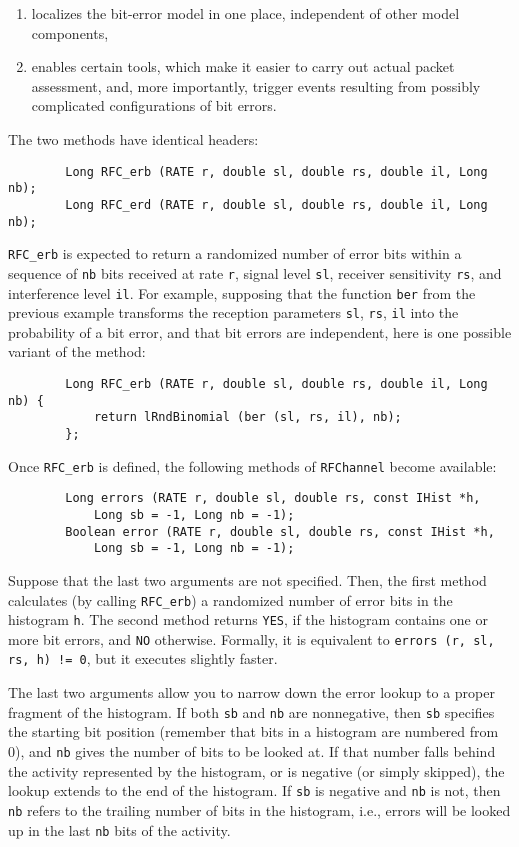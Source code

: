 \begin{enumerate}
\item
localizes the bit-error model in one place, independent of other
model components,
\item
enables certain tools, which make it easier to carry out actual packet
assessment, and, more importantly, trigger events resulting from possibly
complicated configurations of bit errors.
\end{enumerate}

The two methods have identical headers:
\begin{verbatim}
        Long RFC_erb (RATE r, double sl, double rs, double il, Long nb);
        Long RFC_erd (RATE r, double sl, double rs, double il, Long nb);
\end{verbatim}
\noindent
{\tt RFC\_erb}
is expected to return a randomized number of error bits within a
sequence of {\tt nb} bits received at rate {\tt r},
signal level {\tt sl},
receiver sensitivity {\tt rs}, and interference level {\tt il}.
For example, supposing that the function {\tt ber} from the previous example
transforms the reception parameters {\tt sl}, {\tt rs}, {\tt il}
into the probability of a
bit error, and that bit errors are independent, here is one possible
variant of the method:

\begin{verbatim}
        Long RFC_erb (RATE r, double sl, double rs, double il, Long nb) {
            return lRndBinomial (ber (sl, rs, il), nb);
        };
\end{verbatim}
\noindent
Once {\tt RFC\_erb} is defined, the following methods of {\tt RFChannel} become
available:

\begin{verbatim}
        Long errors (RATE r, double sl, double rs, const IHist *h,
            Long sb = -1, Long nb = -1);
        Boolean error (RATE r, double sl, double rs, const IHist *h,
            Long sb = -1, Long nb = -1);
\end{verbatim}
\noindent
Suppose that the last two arguments are not specified.
Then, the first method calculates (by calling {\tt RFC\_erb})
a randomized number of error bits in the histogram {\tt h}.
The second method returns {\tt YES}, if the histogram contains one or more
bit errors, and {\tt NO} otherwise.
Formally, it is equivalent to {\tt errors (r, sl, rs, h) != 0}, but it
executes slightly faster.

The last two arguments allow you to narrow down the error lookup to a
proper fragment of the histogram.
If both {\tt sb} and {\tt nb} are nonnegative, then {\tt sb} specifies
the starting bit position (remember that bits in a histogram
are numbered from 0), and {\tt nb} gives the number of bits to be looked at.
If that number falls behind the activity represented by the histogram, or
is negative (or simply skipped), the lookup extends to the end of the
histogram.
If {\tt sb} is negative and {\tt nb} is not, then {\tt nb} refers to the
trailing number of bits in the histogram, i.e., errors will be looked up in
the last {\tt nb} bits of the activity.

